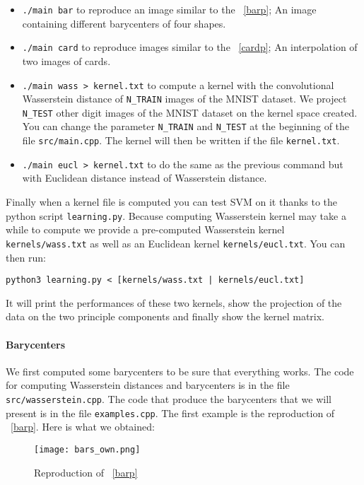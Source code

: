 \begin{itemize}
	\item  \verb|./main bar| to reproduce an image similar to the
	\figurename~\ref{barp}; An image containing different barycenters
	of four shapes.

	\item \verb|./main card| to reproduce images similar to the
	\figurename~\ref{cardp}; An interpolation of two images of cards.

	\item \verb|./main wass > kernel.txt| to compute a kernel with
	the convolutional Wasserstein distance of \verb|N_TRAIN| images of
	the MNIST dataset. We project \verb|N_TEST| other digit images of
	the MNIST dataset on the kernel space created. You can change the
	parameter \verb|N_TRAIN| and \verb|N_TEST| at the beginning of the
	file \verb|src/main.cpp|. The kernel will then be written if the
	file \verb|kernel.txt|.

	\item \verb|./main eucl > kernel.txt| to do the same as the previous
	command but with Euclidean distance instead of Wasserstein distance.
\end{itemize}
Finally when a kernel file is computed you can test SVM on it
thanks to the python script \verb|learning.py|. Because computing
Wasserstein kernel may take a while to compute we provide a pre-computed
Wasserstein kernel \verb|kernels/wass.txt| as well as an Euclidean kernel
\verb|kernels/eucl.txt|. You can then run:
\begin{center}
	\verb=python3 learning.py < [kernels/wass.txt | kernels/eucl.txt]=
\end{center}
It will print the performances of these two kernels, show the projection of
the data on the two principle components and finally show the kernel matrix.

\paragraph{Barycenters}
We first computed some barycenters to be sure that everything works. The
code for computing Wasserstein distances and barycenters is in the file
\verb|src/wasserstein.cpp|. The code that produce the barycenters that we
will present is in the file \verb|examples.cpp|. The first example is the
reproduction of \figurename~\ref{barp}. Here is what we obtained:

\begin{figure}[h]
	\centering
	\texttt{[image: bars\_own.png]}
	\caption{Reproduction of \figurename~\ref{barp}}
\end{figure}

